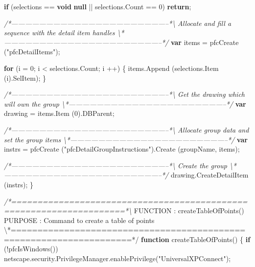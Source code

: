 \documentclass[]{article}
\newenvironment{Shaded}{}{}
\newcommand{\KeywordTok}[1]{\textcolor[rgb]{0.00,0.44,0.13}{\textbf{{#1}}}}
\newcommand{\DecValTok}[1]{\textcolor[rgb]{0.25,0.63,0.44}{{#1}}}
\newcommand{\StringTok}[1]{\textcolor[rgb]{0.25,0.44,0.63}{{#1}}}
\newcommand{\CommentTok}[1]{\textcolor[rgb]{0.38,0.63,0.69}{\textit{{#1}}}}
\newcommand{\OtherTok}[1]{\textcolor[rgb]{0.00,0.44,0.13}{{#1}}}
\newcommand{\FunctionTok}[1]{\textcolor[rgb]{0.02,0.16,0.49}{{#1}}}
\newcommand{\NormalTok}[1]{{#1}}
\begin{document}
\begin{Shaded}
\begin{Highlighting}[]
  \KeywordTok{if} \NormalTok{(selections == }\KeywordTok{void} \KeywordTok{null} \NormalTok{|| }\OtherTok{selections}\NormalTok{.}\FunctionTok{Count} \NormalTok{== }\DecValTok{0}\NormalTok{)}
    \KeywordTok{return}\NormalTok{;}
         
\CommentTok{/*--------------------------------------------------------------------*\textbackslash{}    }
\CommentTok{  Allocate and fill a sequence with the detail item handles }
\CommentTok{\textbackslash{}*--------------------------------------------------------------------*/}     
  \KeywordTok{var} \NormalTok{items = }\FunctionTok{pfcCreate} \NormalTok{(}\StringTok{"pfcDetailItems"}\NormalTok{);}
  
  \KeywordTok{for} \NormalTok{(i = }\DecValTok{0}\NormalTok{; i < }\OtherTok{selections}\NormalTok{.}\FunctionTok{Count}\NormalTok{; i ++)}
    \NormalTok{\{}
      \OtherTok{items}\NormalTok{.}\FunctionTok{Append} \NormalTok{(}\OtherTok{selections}\NormalTok{.}\FunctionTok{Item} \NormalTok{(i).}\FunctionTok{SelItem}\NormalTok{);}
    \NormalTok{\}}
    
\CommentTok{/*--------------------------------------------------------------------*\textbackslash{}    }
\CommentTok{  Get the drawing which will own the group}
\CommentTok{\textbackslash{}*--------------------------------------------------------------------*/}     
  \KeywordTok{var} \NormalTok{drawing = }\OtherTok{items}\NormalTok{.}\FunctionTok{Item} \NormalTok{(}\DecValTok{0}\NormalTok{).}\FunctionTok{DBParent}\NormalTok{;}

\CommentTok{/*--------------------------------------------------------------------*\textbackslash{}    }
\CommentTok{  Allocate group data and set the group items}
\CommentTok{\textbackslash{}*--------------------------------------------------------------------*/}
  \KeywordTok{var} \NormalTok{instrs = }
    \FunctionTok{pfcCreate} \NormalTok{(}\StringTok{"pfcDetailGroupInstructions"}\NormalTok{).}\FunctionTok{Create} \NormalTok{(groupName, items);}
  
\CommentTok{/*--------------------------------------------------------------------*\textbackslash{}    }
\CommentTok{  Create the group}
\CommentTok{\textbackslash{}*--------------------------------------------------------------------*/}     
  \OtherTok{drawing}\NormalTok{.}\FunctionTok{CreateDetailItem} \NormalTok{(instrs);}
\NormalTok{\}}

\CommentTok{/*====================================================================*\textbackslash{}}
\NormalTok{FUNCTION : }\FunctionTok{createTableOfPoints}\NormalTok{() }
\NormalTok{PURPOSE  : Command to create a table of points}
\NormalTok{\textbackslash{}*====================================================================*}\OtherTok{/}
\KeywordTok{function} \FunctionTok{createTableOfPoints}\NormalTok{() }
\NormalTok{\{}
  \KeywordTok{if} \NormalTok{(!}\FunctionTok{pfcIsWindows}\NormalTok{())}
    \OtherTok{netscape}\NormalTok{.}\OtherTok{security}\NormalTok{.}\OtherTok{PrivilegeManager}\NormalTok{.}\FunctionTok{enablePrivilege}\NormalTok{(}\StringTok{"UniversalXPConnect"}\NormalTok{);   }
  

\end{Highlighting}
\end{Shaded}
\end{document}
